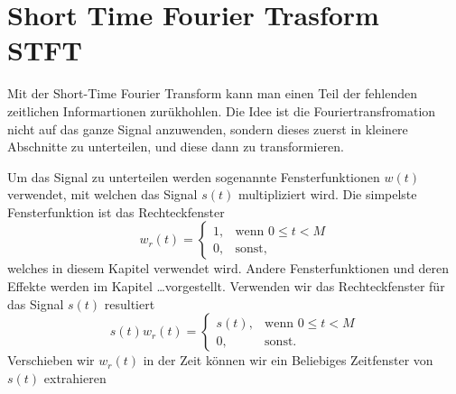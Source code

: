 %
%
%
%
\section{Short Time Fourier Trasform STFT\label{sonogramm:section:teil0}}
Mit der Short-Time Fourier Transform kann man einen Teil der fehlenden zeitlichen Informartionen zurükhohlen.
Die Idee ist die Fouriertransfromation nicht auf das ganze Signal anzuwenden, sondern dieses zuerst in kleinere
Abschnitte zu unterteilen, und diese dann zu transformieren.

Um das Signal zu unterteilen werden sogenannte Fensterfunktionen $w(t)$ verwendet, mit welchen das Signal
$s(t)$ multipliziert wird.
Die simpelste Fensterfunktion ist das Rechteckfenster
\begin{equation}
    w_r(t) = 
        \begin{cases}
        1,& \text{wenn } 0 \le t < M\\
        0, & \text{sonst, }
        \end{cases}
\end{equation}
welches in diesem Kapitel verwendet wird.
Andere Fensterfunktionen und deren Effekte werden im Kapitel \dots vorgestellt.
Verwenden wir das Rechteckfenster für das Signal $s(t)$ resultiert 
\begin{equation}
    s(t) w_r(t) = 
    \begin{cases}
    s(t),& \text{wenn } 0 \le t < M\\
    0, & \text{sonst.}
    \end{cases}
\end{equation}
Verschieben wir $w_r(t)$ in der Zeit können wir ein Beliebiges Zeitfenster von $s(t)$
extrahieren